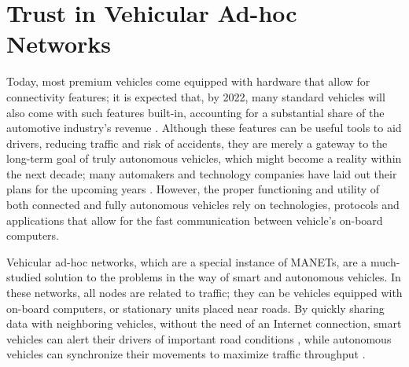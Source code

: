 \section{Trust in Vehicular Ad-hoc Networks}
\label{chap:vanets}

Today, most premium vehicles come equipped with hardware that allow for connectivity features; it is expected that, by 2022, many standard vehicles will also come with such features built-in, accounting for a substantial share of the automotive industry's revenue \citep{connectedcar2016}.
Although these features can be useful tools to aid drivers, reducing traffic and risk of accidents, they are merely a gateway to the long-term goal of truly autonomous vehicles, which might become a reality within the next decade; many automakers and technology companies have laid out their plans for the upcoming years \citep{tesla2016}.
However, the proper functioning and utility of both connected and fully autonomous vehicles rely on technologies, protocols and applications that allow for the fast communication between vehicle's on-board computers.

Vehicular ad-hoc networks, which are a special instance of MANETs, are a much-studied solution to the problems in the way of smart and autonomous vehicles.
In these networks, all nodes are related to traffic; they can be vehicles equipped with on-board computers, or stationary units placed near roads.
By quickly sharing data with neighboring vehicles, without the need of an Internet connection, smart vehicles can alert their drivers of important road conditions \citep{barba2012smart}, while autonomous vehicles can synchronize their movements to maximize traffic throughput \citep{amoozadeh2015platoon}.



